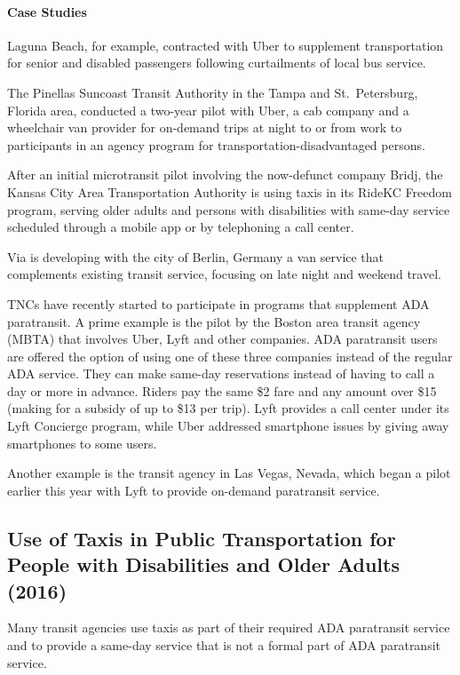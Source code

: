 \documentclass[]{article}
\let\oldparagraph\paragraph
\renewcommand{\paragraph}[1]{\oldparagraph{#1}\mbox{}}
\begin{document}
\hypertarget{case-studies}{%
\paragraph{Case Studies}\label{case-studies}}

Laguna Beach, for example, contracted with Uber to supplement
transportation for senior and disabled passengers following curtailments
of local bus service.

The Pinellas Suncoast Transit Authority in the Tampa and St.~Petersburg,
Florida area, conducted a two-year pilot with Uber, a cab company and a
wheelchair van provider for on-demand trips at night to or from work to
participants in an agency program for transportation-disadvantaged
persons.

After an initial microtransit pilot involving the now-defunct company
Bridj, the Kansas City Area Transportation Authority is using taxis in
its RideKC Freedom program, serving older adults and persons with
disabilities with same-day service scheduled through a mobile app or by
telephoning a call center.

Via is developing with the city of Berlin, Germany a van service that
complements existing transit service, focusing on late night and weekend
travel.

TNCs have recently started to participate in programs that supplement
ADA paratransit. A prime example is the pilot by the Boston area transit
agency (MBTA) that involves Uber, Lyft and other companies. ADA
paratransit users are offered the option of using one of these three
companies instead of the regular ADA service. They can make same-day
reservations instead of having to call a day or more in advance. Riders
pay the same \$2 fare and any amount over \$15 (making for a subsidy of
up to \$13 per trip). Lyft provides a call center under its Lyft
Concierge program, while Uber addressed smartphone issues by giving away
smartphones to some users.

Another example is the transit agency in Las Vegas, Nevada, which began
a pilot earlier this year with Lyft to provide on-demand paratransit
service.

\hypertarget{use-of-taxis-in-public-transportation-for-people-with-disabilities-and-older-adults-2016}{%
\subsection{Use of Taxis in Public Transportation for People with
Disabilities and Older Adults
(2016)}\label{use-of-taxis-in-public-transportation-for-people-with-disabilities-and-older-adults-2016}}

Many transit agencies use taxis as part of their required ADA
paratransit service and to provide a same-day service that is not a
formal part of ADA paratransit service.
\end{document}

